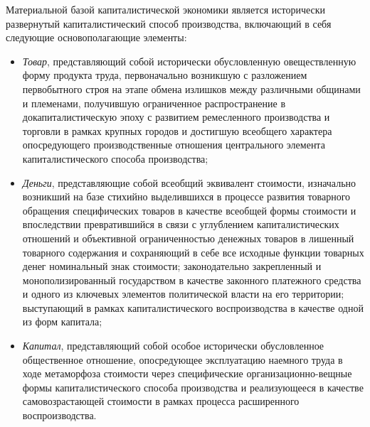 Материальной базой капиталистической экономики является исторически развернутый капиталистический способ производства, включающий в себя следующие основополагающие элементы:
\begin{itemize}
    \item \textit{Товар}, представляющий собой исторически обусловленную овеществленную форму продукта труда, первоначально возникшую с разложением первобытного строя на этапе обмена излишков между различными общинами и племенами, получившую ограниченное распространение в докапиталистическую эпоху с развитием ремесленного производства и торговли в рамках крупных городов и достигшую всеобщего характера опосредующего производственные отношения центрального элемента капиталистического способа производства;
    \item \textit{Деньги}, представляющие собой всеобщий эквивалент стоимости, изначально возникший на базе стихийно выделившихся в процессе развития товарного обращения специфических товаров в качестве всеобщей формы стоимости и впоследствии превратившийся в связи с углублением капиталистических отношений и объективной ограниченностью денежных товаров в лишенный товарного содержания и сохраняющий в себе все исходные функции товарных денег номинальный знак стоимости; законодательно закрепленный и монополизированный государством в качестве законного платежного средства и одного из ключевых элементов политической власти на его территории; выступающий в рамках капиталистического воспроизводства в качестве одной из форм капитала;
    \item \textit{Капитал}, представляющий собой особое исторически обусловленное общественное отношение, опосредующее эксплуатацию наемного труда в ходе метаморфоза стоимости через специфические организационно-вещные формы капиталистического способа производства и реализующееся в качестве самовозрастающей стоимости в рамках процесса расширенного воспроизводства.
\end{itemize}


